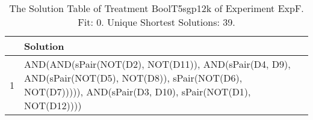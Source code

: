 \begin{table}[ht]
\centering
\begin{tabular}{rp{9cm}}
  \hline
 & Solution \\ 
  \hline
1 & AND(AND(sPair(NOT(D2), NOT(D11)), AND(sPair(D4, D9), AND(sPair(NOT(D5), NOT(D8)), sPair(NOT(D6), NOT(D7))))), AND(sPair(D3, D10), sPair(NOT(D1), NOT(D12)))) \\ 
   \hline
\end{tabular}
\caption{The Solution Table of Treatment BoolT5sgp12k of Experiment ExpF. Fit: 0. Unique Shortest Solutions: 39.} 
\end{table}
